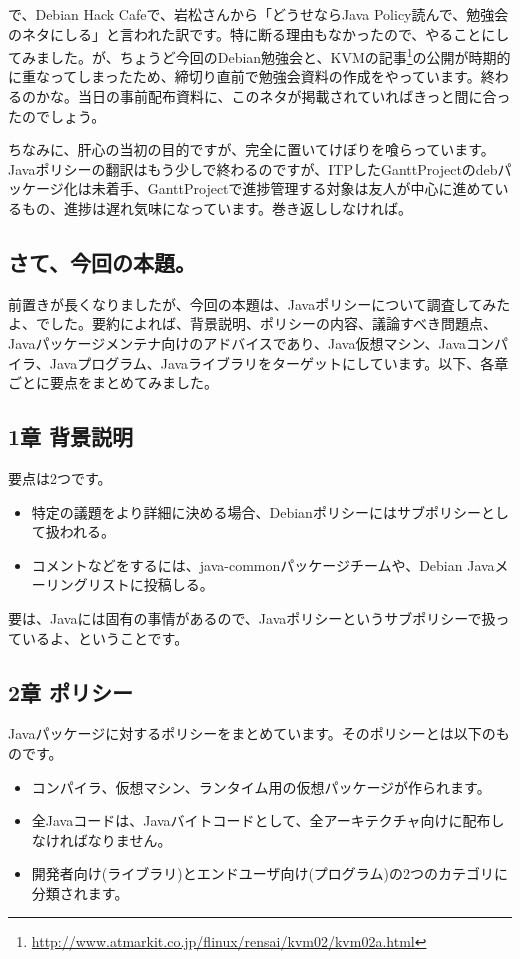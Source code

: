 \documentclass[mingoth,a4paper]{jsarticle}
\begin{document}
で、Debian Hack Cafeで、岩松さんから「どうせならJava Policy読んで、勉強会のネタにしる」と言われた訳です。特に断る理由もなかったので、やることにしてみました。が、ちょうど今回のDebian勉強会と、KVMの記事\footnote{\url{http://www.atmarkit.co.jp/flinux/rensai/kvm02/kvm02a.html}}の公開が時期的に重なってしまったため、締切り直前で勉強会資料の作成をやっています。終わるのかな。当日の事前配布資料に、このネタが掲載されていればきっと間に合ったのでしょう。

ちなみに、肝心の当初の目的ですが、完全に置いてけぼりを喰らっています。Javaポリシーの翻訳はもう少しで終わるのですが、ITPしたGanttProjectのdebパッケージ化は未着手、GanttProjectで進捗管理する対象は友人が中心に進めているもの、進捗は遅れ気味になっています。巻き返ししなければ。


\subsection{さて、今回の本題。}
前置きが長くなりましたが、今回の本題は、Javaポリシーについて調査してみたよ、でした。要約によれば、背景説明、ポリシーの内容、議論すべき問題点、Javaパッケージメンテナ向けのアドバイスであり、Java仮想マシン、Javaコンパイラ、Javaプログラム、Javaライブラリをターゲットにしています。以下、各章ごとに要点をまとめてみました。

\subsection{1章 背景説明}
要点は2つです。
\begin{itemize}
\item 特定の議題をより詳細に決める場合、Debianポリシーにはサブポリシーとして扱われる。
\item コメントなどをするには、java-commonパッケージチームや、Debian Javaメーリングリストに投稿しる。
\end{itemize}
要は、Javaには固有の事情があるので、Javaポリシーというサブポリシーで扱っているよ、ということです。

\subsection{2章 ポリシー}
Javaパッケージに対するポリシーをまとめています。そのポリシーとは以下のものです。
\begin{itemize}
\item コンパイラ、仮想マシン、ランタイム用の仮想パッケージが作られます。
\item 全Javaコードは、Javaバイトコードとして、全アーキテクチャ向けに配布しなければなりません。
\item 開発者向け(ライブラリ)とエンドユーザ向け(プログラム)の2つのカテゴリに分類されます。
\end{itemize}
\end{document}
